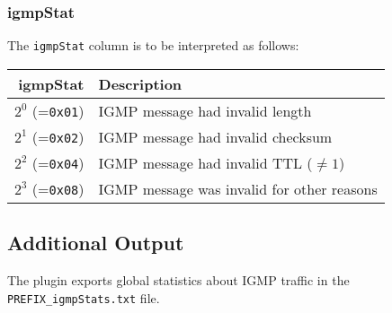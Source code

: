 \documentclass[documentation]{subfiles}
\begin{document}
\subsubsection{igmpStat}\label{igmpStat}
The {\tt igmpStat} column is to be interpreted as follows:
\begin{longtable}{rl}
    \toprule
    {\bf igmpStat} & {\bf Description} \\
    \midrule\endhead%
    $2^0$ (={\tt 0x01}) & IGMP message had invalid length\\
    $2^1$ (={\tt 0x02}) & IGMP message had invalid checksum\\
    $2^2$ (={\tt 0x04}) & IGMP message had invalid TTL ($\neq1$)\\
    $2^3$ (={\tt 0x08}) & IGMP message was invalid for other reasons\\
    \bottomrule
\end{longtable}

\subsection{Additional Output}
The plugin exports global statistics about IGMP traffic in the {\tt PREFIX\_igmpStats.txt} file.
\end{document}
